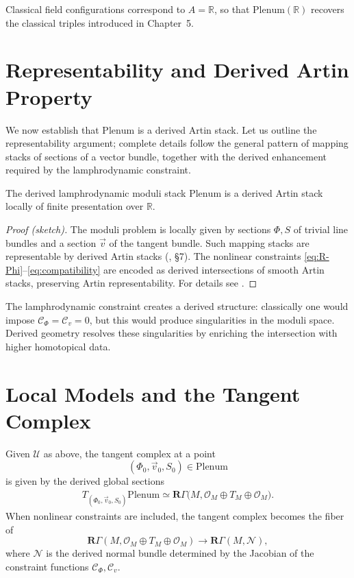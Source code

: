 Classical field configurations correspond to $A=\mathbb{R}$,
so that $\mathrm{Plenum}(\mathbb{R})$ recovers the classical triples
introduced in Chapter~5.


\section{Representability and Derived Artin Property}

We now establish that $\mathrm{Plenum}$ is a derived Artin stack.
Let us outline the representability argument; complete details follow
the general pattern of mapping stacks of sections of a vector bundle,
together with the derived enhancement required by the lamphrodynamic
constraint.

\begin{theorem}
\label{thm:Plenum-Artin}
The derived lamphrodynamic moduli stack $\mathrm{Plenum}$ is
a derived Artin stack locally of finite presentation over $\mathbb{R}$.
\end{theorem}

\begin{proof}[Proof (sketch)]
The moduli problem is locally given by sections $\Phi,S$ of trivial
line bundles and a section $\vec v$ of the tangent bundle.
Such mapping stacks are representable by derived Artin stacks
(\cite{ToenVezzosi-HAGII}, \S7).
The nonlinear constraints \eqref{eq:R-Phi}--\eqref{eq:compatibility}
are encoded as derived intersections of smooth Artin stacks,
preserving Artin representability. For details see
\cite{Lurie-DAG,ToenVezzosi-HAGII}.
\end{proof}

\begin{remark}
The lamphrodynamic constraint creates a derived structure:
classically one would impose $\mathcal{C}_\Phi=\mathcal{C}_v=0$,
but this would produce singularities in the moduli space.
Derived geometry resolves these singularities by enriching the
intersection with higher homotopical data.
\end{remark}


\section{Local Models and the Tangent Complex}

Given $\mathcal{U}$ as above,
the tangent complex at a point
\[
(\Phi_0,\vec v_0,S_0)\in \mathrm{Plenum}
\]
is given by the derived global sections
\begin{align}
T_{(\Phi_0,\vec v_0,S_0)}\mathrm{Plenum}
\simeq
\mathbf{R}\Gamma\bigl(
M,
\mathcal{O}_M \oplus T_M \oplus \mathcal{O}_M
\bigr).
\end{align}
When nonlinear constraints are included, the tangent complex becomes the
fiber of
\[
\mathbf{R}\Gamma(
M,
\mathcal{O}_M \oplus T_M \oplus \mathcal{O}_M
)
\longrightarrow
\mathbf{R}\Gamma(M, \mathcal{N}),
\]
where $\mathcal{N}$ is the derived normal bundle determined by the
Jacobian of the constraint functions
$\mathcal{C}_\Phi,\mathcal{C}_v$.

